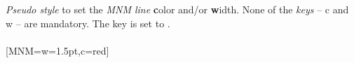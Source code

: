 \\ [10pt]\makebox[\linewidth][c]{\scalebox{.6}{\pgfPT[MNM line width=1.5pt]}}%
\\ [0pt]\pgfPTendoption%
\label{style_MNM}%
%
{\textit{Pseudo style} to set the \textit{MNM line} \textbf{c}olor and/or \textbf{w}idth. None of the \textit{keys} -- c and w -- are mandatory. The key  is set to .
\\ [3pt]%
}%
\\ [5pt][MNM={w=1.5pt,c=red}]%
\\ [10pt]\makebox[\linewidth][c]{\scalebox{.6}{\pgfPT[MNM={w=1.5pt,c=red}]}}%
\\ [0pt]\pgfPTendstyle%
\endinput%
